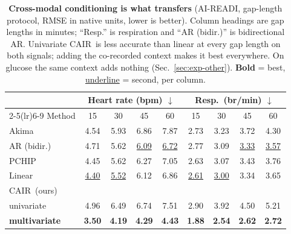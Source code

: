 \begin{table}[t]
\centering
  \setlength{\tabcolsep}{1mm}
  {\small
\begin{tabular}{lcccccccc}
\toprule
& \multicolumn{4}{c}{Heart rate (bpm) $\downarrow$} & \multicolumn{4}{c}{Resp.\ (br/min) $\downarrow$} \\
\cmidrule(lr){2-5}\cmidrule(lr){6-9}
Method & 15 & 30 & 45 & 60 & 15 & 30 & 45 & 60 \\
\midrule
Akima              & 4.54 & 5.93 & 6.86 & 7.87 & 2.73 & 3.23 & 3.72 & 4.30 \\
AR (bidir.)        & 4.71 & 5.62 & \underline{6.09} & \underline{6.72} & 2.77 & 3.09 & \underline{3.33} & \underline{3.57} \\
PCHIP              & 4.45 & 5.62 & 6.27 & 7.05 & 2.63 & 3.07 & 3.43 & 3.76 \\
Linear             & \underline{4.40} & \underline{5.52} & 6.12 & 6.86 & \underline{2.61} & \underline{3.00} & 3.34 & 3.65 \\
\midrule
\multicolumn{9}{l}{CAIR\ (ours)} \\
\quad univariate   & 4.96 & 6.49 & 6.74 & 7.51 & 2.90 & 3.92 & 4.50 & 5.21 \\
\quad \textbf{multivariate} & \textbf{3.50} & \textbf{4.19} & \textbf{4.29} & \textbf{4.43} & \textbf{1.88} & \textbf{2.54} & \textbf{2.62} & \textbf{2.72} \\
\bottomrule
\end{tabular}}
  \caption{\textbf{Cross-modal conditioning is what transfers} (AI-READI,
gap-length protocol, RMSE in native units, lower is better). Column headings are
gap lengths in minutes; ``Resp.'' is respiration and ``AR (bidir.)'' is
bidirectional AR. Univariate
CAIR\ is less accurate than linear at every gap length on both signals; adding
the co-recorded context makes it best everywhere. On glucose the same context
adds nothing (Sec.~\ref{sec:exp-other}). \textbf{Bold} = best, \underline{underline} = second, per column.}
  \label{tab:hr-resp}
\end{table}

